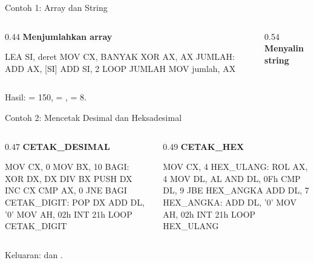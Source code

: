 \documentclass[aspectratio=169,11pt]{beamer}
\begin{document}
\begin{frame}[fragile]{Contoh 1: Array dan String}
\begin{columns}[t]
\begin{column}{0.44\textwidth}
{\color{obeTeal}\bfseries Menjumlahkan array}\\[0.15em]
\begin{kodeasm}[numbers=none]
LEA SI, deret
MOV CX, BANYAK
XOR AX, AX
JUMLAH:
    ADD AX, [SI]
    ADD SI, 2
    LOOP JUMLAH
MOV jumlah, AX
\end{kodeasm}
\end{column}
\begin{column}{0.54\textwidth}
{\color{obeTeal}\bfseries Menyalin string}\\[0.15em]
\end{column}
\end{columns}

\vspace{0.1em}
{\footnotesize\color{obeGray}Hasil:  = 150,
 = ,  = 8.\par}
\end{frame}

\begin{frame}[fragile]{Contoh 2: Mencetak Desimal dan Heksadesimal}
\begin{columns}[t]
\begin{column}{0.47\textwidth}
{\color{obeTeal}\bfseries CETAK\_DESIMAL}\\[0.15em]
\begin{kodeasm}[numbers=none]
MOV CX, 0
MOV BX, 10
BAGI:
    XOR DX, DX
    DIV BX
    PUSH DX
    INC CX
    CMP AX, 0
    JNE BAGI
CETAK_DIGIT:
    POP DX
    ADD DL, '0'
    MOV AH, 02h
    INT 21h
    LOOP CETAK_DIGIT
\end{kodeasm}
\end{column}
\begin{column}{0.49\textwidth}
{\color{obeTeal}\bfseries CETAK\_HEX}\\[0.15em]
\begin{kodeasm}[numbers=none]
MOV CX, 4
HEX_ULANG:
    ROL AX, 4
    MOV DL, AL
    AND DL, 0Fh
    CMP DL, 9
    JBE HEX_ANGKA
    ADD DL, 7
HEX_ANGKA:
    ADD DL, '0'
    MOV AH, 02h
    INT 21h
    LOOP HEX_ULANG
\end{kodeasm}
\end{column}
\end{columns}

\vspace{0.1em}
{\footnotesize\color{obeGray}Keluaran:  dan
.\par}
\end{frame}
\end{document}
